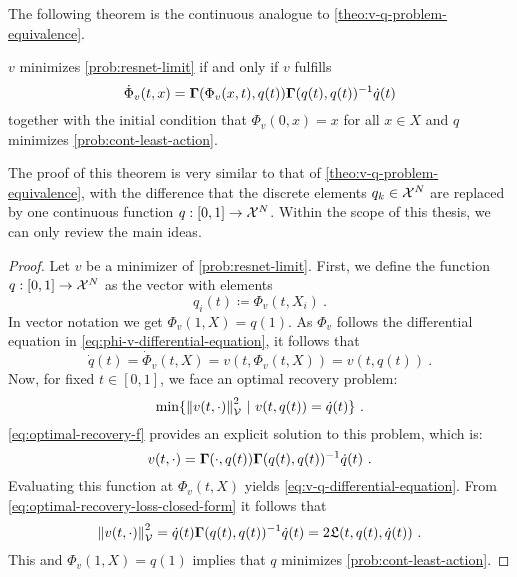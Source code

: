 The following theorem is the continuous analogue to \cref{theo:v-q-problem-equivalence}.
\begin{theorem}
	\label{theo:v-q-continuous-problem-equivalence}
	$v$ minimizes \cref{prob:resnet-limit} if and only if $v$ fulfills
	\begin{equation}
			\label{eq:v-q-differential-equation}
			\dot{\Phi}_v(t, x) = \mathbf{\Gamma}(\Phi_v(x, t), q(t)) \mathbf{\Gamma}(q(t), q(t))^{-1} \dot{q}(t)
	\end{equation}
	together with the initial condition that $\Phi_v(0, x) = x$ for all $x \in X$ and $q$ minimizes \cref{prob:cont-least-action}.
\end{theorem}
The proof of this theorem is very similar to that of \cref{theo:v-q-problem-equivalence}, with the difference that the discrete elements $q_k \in \mathcal{X}^N$ are replaced by one continuous function $q: [0, 1] \rightarrow \mathcal{X}^N$.
Within the scope of this thesis, we can only review the main ideas.
\begin{proof}
	Let $v$ be a minimizer of \cref{prob:resnet-limit}.
	First, we define the function $q: [0, 1] \rightarrow \mathcal{X}^N$ as the vector with elements
	\begin{equation}
		q_i(t) \coloneqq \Phi_v(t, X_i) \ .
	\end{equation}
	In vector notation we get $\Phi_v(1, X) = q(1)$.
	As $\Phi_v$ follows the differential equation in \ref{eq:phi-v-differential-equation}, it follows that 
	\begin{equation}
		\dot{q}(t) = \dot{\Phi}_v(t, X) = v(t, \Phi_v(t, X)) = v(t, q(t)) \ .
	\end{equation}
	Now, for fixed $t \in [0, 1]$, we face an optimal recovery problem:
	\begin{equation}
		\min\{\norm{v(t, \cdot)}_{\mathcal{V}}^2\ |\ v(t, q(t)) = \dot{q}(t)\} \ .
	\end{equation}
	\cref{eq:optimal-recovery-f} provides an explicit solution to this problem, which is:
	\begin{equation}
		v(t, \cdot) = \mathbf{\Gamma}(\cdot, q(t))\mathbf{\Gamma}(q(t), q(t))^{-1}\dot{q}(t) \ .
	\end{equation}
	Evaluating this function at $\Phi_v(t, X)$ yields \cref{eq:v-q-differential-equation}.
	From \cref{eq:optimal-recovery-loss-closed-form} it follows that 
	\begin{equation}
		\norm{v(t, \cdot)}_{\mathcal{V}}^2 = \dot{q}(t) \mathbf{\Gamma}(q(t), q(t))^{-1} \dot{q}(t) = 2 \mathfrak{L}(t, q(t), \dot{q}(t))  \ .
	\end{equation}
	This and $\Phi_v(1, X) = q(1)$ implies that $q$ minimizes \cref{prob:cont-least-action}.
\end{proof}

